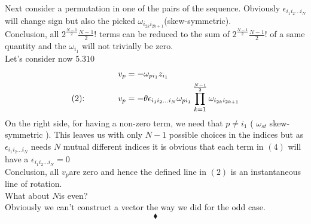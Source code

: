 Next consider a permutation in one of the pairs of the sequence. Obviously $\epsilon_{i_{1} i_{2} \dots i_{N}}$ will change sign but also the picked $\omega_{i_{2k} i_{2k+1}}$(skew-symmetric). \\
Conclusion, all $2^{\frac{N-1}{2}}\frac{N-1}{2}!$ terms can be reduced to the sum of $2^{\frac{N-1}{2}}\frac{N-1}{2}!$ of a same quantity and the  $\omega_{i_1}$ will not trivially be zero.\\
Let's consider now $\mathbf{5.310}$
\begin{align}
v_p &= - \omega_{pi_{1}}z_{i_{1}}\\
\text{(2):}\quad\quad\quad\quad v_p &= -\theta \epsilon_{i_{1} i_{2} \dots i_{N}}\omega_{pi_{1}}\prod_{k=1}^{\frac{N-1}{2}}\omega_{i_{2k} i_{2k+1}}
\end{align}
On the right side, for having a non-zero term, we need that $p\ne i_{1}$ ( $\omega_{st}$ skew-symmetric ). This leaves us with only $N-1$ possible choices in the indices but as $\epsilon_{i_{1} i_{2} \dots i_{N}}$ needs $N$ mutual different indices it is obvious that each term in $(4)$ will have a $\epsilon_{i_{1} i_{2} \dots i_{N}}= 0$ \\
Conclusion, all $v_p$are zero and hence the defined line in $(2)$ is an instantaneous line of rotation.
\\
What about $N$is even?\\
Obviously we can't construct a vector the way we did for the odd case.
$$\blacklozenge$$
\newpage 



